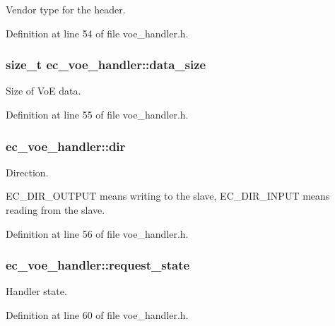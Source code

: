 \-Vendor type for the header. 



\-Definition at line 54 of file voe\-\_\-handler.\-h.

\subsubsection[{data\-\_\-size}]{\setlength{\rightskip}{0pt plus 5cm}size\-\_\-t {\bf ec\-\_\-voe\-\_\-handler\-::data\-\_\-size}}\label{structec__voe__handler_a8f7609a3c03d2eab155ea2d24c4353e2}


\-Size of \-Vo\-E data. 



\-Definition at line 55 of file voe\-\_\-handler.\-h.

\subsubsection[{dir}]{ {\bf ec\-\_\-voe\-\_\-handler\-::dir}}\label{structec__voe__handler_a4930b843f8706117298fd50362514117}


\-Direction. 

\-E\-C\-\_\-\-D\-I\-R\-\_\-\-O\-U\-T\-P\-U\-T means writing to the slave, \-E\-C\-\_\-\-D\-I\-R\-\_\-\-I\-N\-P\-U\-T means reading from the slave. 

\-Definition at line 56 of file voe\-\_\-handler.\-h.

\subsubsection[{request\-\_\-state}]{ {\bf ec\-\_\-voe\-\_\-handler\-::request\-\_\-state}}\label{structec__voe__handler_a08b2653c2e110c29f17b28dce2094c69}


\-Handler state. 



\-Definition at line 60 of file voe\-\_\-handler.\-h.

